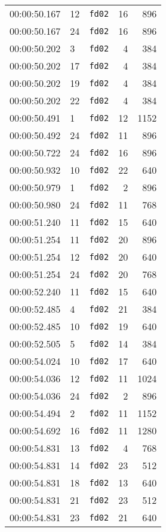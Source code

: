 \documentclass{article}
\begin{document}
\begin{longtable}{lllrr}
00:00:50.167 & 12 & \texttt{fd02} & 16 & 896 \\
00:00:50.167 & 24 & \texttt{fd02} & 16 & 896 \\
00:00:50.202 & 3 & \texttt{fd02} & 4 & 384 \\
00:00:50.202 & 17 & \texttt{fd02} & 4 & 384 \\
00:00:50.202 & 19 & \texttt{fd02} & 4 & 384 \\
00:00:50.202 & 22 & \texttt{fd02} & 4 & 384 \\
00:00:50.491 & 1 & \texttt{fd02} & 12 & 1152 \\
00:00:50.492 & 24 & \texttt{fd02} & 11 & 896 \\
00:00:50.722 & 24 & \texttt{fd02} & 16 & 896 \\
00:00:50.932 & 10 & \texttt{fd02} & 22 & 640 \\
00:00:50.979 & 1 & \texttt{fd02} & 2 & 896 \\
00:00:50.980 & 24 & \texttt{fd02} & 11 & 768 \\
00:00:51.240 & 11 & \texttt{fd02} & 15 & 640 \\
00:00:51.254 & 11 & \texttt{fd02} & 20 & 896 \\
00:00:51.254 & 12 & \texttt{fd02} & 20 & 640 \\
00:00:51.254 & 24 & \texttt{fd02} & 20 & 768 \\
00:00:52.240 & 11 & \texttt{fd02} & 15 & 640 \\
00:00:52.485 & 4 & \texttt{fd02} & 21 & 384 \\
00:00:52.485 & 10 & \texttt{fd02} & 19 & 640 \\
00:00:52.505 & 5 & \texttt{fd02} & 14 & 384 \\
00:00:54.024 & 10 & \texttt{fd02} & 17 & 640 \\
00:00:54.036 & 12 & \texttt{fd02} & 11 & 1024 \\
00:00:54.036 & 24 & \texttt{fd02} & 2 & 896 \\
00:00:54.494 & 2 & \texttt{fd02} & 11 & 1152 \\
00:00:54.692 & 16 & \texttt{fd02} & 11 & 1280 \\
00:00:54.831 & 13 & \texttt{fd02} & 4 & 768 \\
00:00:54.831 & 14 & \texttt{fd02} & 23 & 512 \\
00:00:54.831 & 18 & \texttt{fd02} & 13 & 640 \\
00:00:54.831 & 21 & \texttt{fd02} & 23 & 512 \\
00:00:54.831 & 23 & \texttt{fd02} & 21 & 640 \\

\end{longtable}
\end{document}

